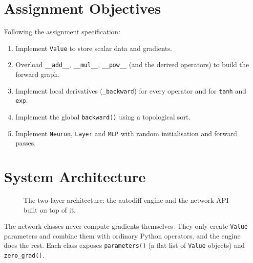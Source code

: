 \documentclass[11pt,a4paper]{article}
\begin{document}
\section{Assignment Objectives}
Following the assignment specification:
\begin{enumerate}
  \item Implement \texttt{Value} to store scalar data and gradients.
  \item Overload \texttt{\_\_add\_\_}, \texttt{\_\_mul\_\_}, \texttt{\_\_pow\_\_} (and the derived operators) to build the forward graph.
  \item Implement local derivatives (\texttt{\_backward}) for every operator and for \texttt{tanh} and \texttt{exp}.
  \item Implement the global \texttt{backward()} using a topological sort.
  \item Implement \texttt{Neuron}, \texttt{Layer} and \texttt{MLP} with random initialisation and forward passes.
\end{enumerate}

\section{System Architecture}
\begin{figure}[H]
\centering
{}
\caption{The two-layer architecture: the autodiff engine and the network API built on top of it.}
\end{figure}
The network classes never compute gradients themselves. They only create \texttt{Value} parameters and
combine them with ordinary Python operators, and the engine does the rest. Each class exposes
\texttt{parameters()} (a flat list of \texttt{Value} objects) and \texttt{zero\_grad()}.
\end{document}
